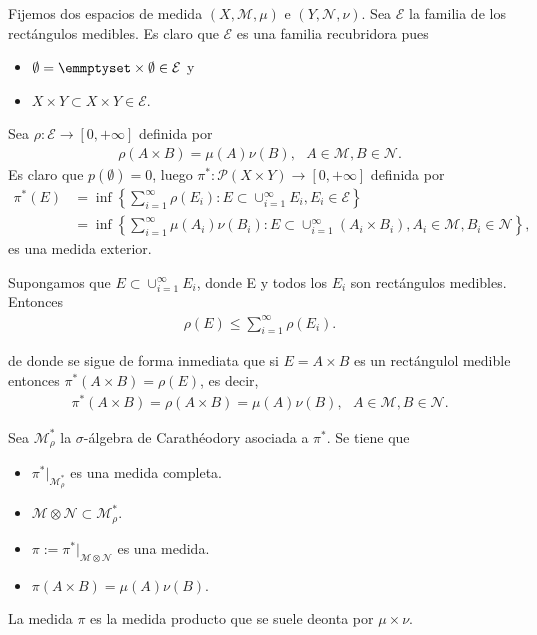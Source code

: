 Fijemos dos espacios de medida $(X, \mathcal{M}, \mu)$ e $(Y, \mathcal{N}, \nu)$. Sea $\mathcal{E}$ la familia de los rectángulos medibles. Es claro que $\mathcal{E}$ es una familia recubridora pues
\begin{itemize}
    \item $\emptyset = \emmptyset \times \emptyset \in \mathcal{E}$ y
    \item $X \times Y \subset X \times Y \in \mathcal{E}$.
\end{itemize}
Sea $\rho : \mathcal{E} \longrightarrow [0,+\infty]$ definida por
\begin{align*}
    \rho(A \times B) = \mu(A)\nu(B), \ \ \ A \in \mathcal{M}, B \in \mathcal{N}.
\end{align*}
Es claro que $p(\emptyset) = 0$, luego $\pi^* : \mathcal{P}(X \times Y) \longrightarrow [0,+\infty]$ definida por
\begin{align*}
    \pi^*(E) &= \inf\left\{ \sum_{i=1}^{\infty}{\rho(E_i)} : E \subset \cup_{i=1}^{\infty}{E_i}, E_i \in \mathcal{E}\right\} \\
     &= \inf\left\{ \sum_{i=1}^{\infty}{\mu(A_i)\nu(B_i)} : E \subset \cup_{i=1}^{\infty}{(A_i \times  B_i)}, A_i \in \mathcal{M}, B_i \in \mathcal{N}\right\},
\end{align*}
es una medida exterior.

\begin{prop}
Supongamos que $E \subset \cup_{i=1}^{\infty}{E_i}$, donde E y todos los $E_i$ son rectángulos medibles. Entonces
\begin{align*}
    \rho(E) \leq \sum_{i=1}^{\infty}{\rho(E_i)}.
\end{align*}
\end{prop}
de donde se sigue de forma inmediata que si $E = A \times B$ es un rectángulol medible entonces $\pi^*(A \times B) = \rho(E)$, es decir,
\begin{align*}
    \pi^*(A \times B) = \rho(A \times B) = \mu(A)\nu(B), \ \ \ A \in \mathcal{M}, B \in \mathcal{N}.
\end{align*}

\begin{prop}
Sea $\mathcal{M}^*_{\rho}$ la $\sigma$-álgebra de Carathéodory asociada a $\pi^*$. Se tiene que
\begin{itemize}
    \item $\pi^*|_{\mathcal{M}^*_{\rho}}$ es una medida completa.
    \item $\mathcal{M} \otimes \mathcal{N} \subset \mathcal{M}^*_{\rho}$.
    \item $\pi := \pi^*|_{\mathcal{M} \otimes \mathcal{N}}$ es una medida.
    \item $\pi(A \times B) = \mu(A)\nu(B)$.
\end{itemize}
\end{prop}
La medida $\pi$ es la medida producto que se suele deonta por $\mu \times \nu$.


